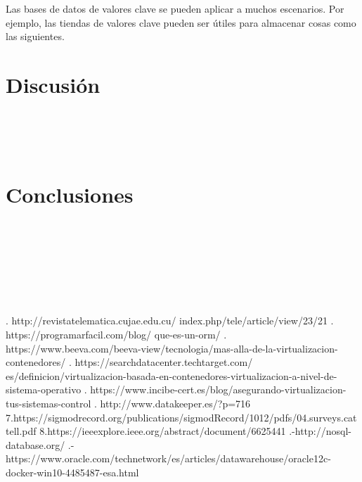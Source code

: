 \documentclass[twoside,onecolumn]{article}
\begin{document}
\begin{flushright}
\begin{itemize}
Las bases de datos de valores clave se pueden aplicar a muchos escenarios. Por ejemplo, las tiendas de valores clave pueden ser útiles para almacenar cosas como las siguientes.




\section{Discusión}





\textbf{}\\
\textbf{}\\
\textbf{}\\




\section{Conclusiones}
\textbf{}\\
\textbf{}\\
\textbf{}\\
\textbf{}\\




\textbf{}\\
\textbf{}\\

\begin{thebibliography}{99} %



. http://revistatelematica.cujae.edu.cu/
index.php/tele/article/view/23/21
 \break
{}. https://programarfacil.com/blog/
que-es-un-orm/
\break
{}. https://www.beeva.com/beeva-view/tecnologia/mas-alla-de-la-virtualizacion-contenedores/
\break
{}. https://searchdatacenter.techtarget.com/
es/definicion/virtualizacion-basada-en-contenedores-virtualizacion-a-nivel-de-sistema-operativo
\break
{}. https://www.incibe-cert.es/blog/asegurando-virtualizacion-tus-sistemas-control
\break
{}. http://www.datakeeper.es/?p=716
\break
\newblock
7.https://sigmodrecord.org/publications/sigmodRecord/1012/pdfs/04.surveys.cattell.pdf
\break
\newblock
8.https://ieeexplore.ieee.org/abstract/document/6625441
\break
{}.-http://nosql-database.org/
\break
{}.-https://www.oracle.com/technetwork/es/articles/datawarehouse/oracle12c-docker-win10-4485487-esa.html
\break
\newblock {\em }
 
\end{thebibliography}



\end{itemize}
\end{flushright}
\end{document}
